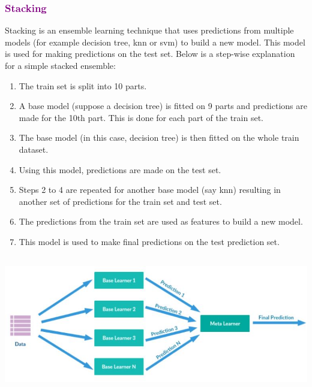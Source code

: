 \subsubsection*{\textcolor{purple}{Stacking}}
Stacking is an ensemble learning technique that uses predictions from multiple models (for example decision tree, knn or svm) to build a new model. This model is used for making predictions on the test set. Below is a step-wise explanation for a simple stacked ensemble:
\begin{enumerate}
    \item The train set is split into 10 parts.
    \item A base model (suppose a decision tree) is fitted on 9 parts and predictions are made for the 10th part. This is done for each part of the train set.
    \item The base model (in this case, decision tree) is then fitted on the whole train dataset.
    \item Using this model, predictions are made on the test set.
    \item Steps 2 to 4 are repeated for another base model (say knn) resulting in another set of predictions for the train set and test set.

    \item The predictions from the train set are used as features to build a new model.
    \item This model is used to make final predictions on the test prediction set.
\end{enumerate}
\begin{center}
   \includegraphics[height=6cm]{Images/A8_img2.jpg}
\end{center}
